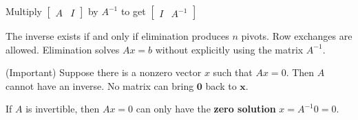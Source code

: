 \begin{center}
    Multiply $ \left[\begin{matrix}
                A & I
            \end{matrix}\right]$ by $ A^{-1}$ to get $ \left[\begin{matrix}
                I & A^{-1}
            \end{matrix}\right]$
\end{center}

\begin{remark}
    The inverse exists if and only if elimination produces $n$ pivots. Row exchanges are allowed. Elimination solves $Ax = b$ without explicitly using the matrix $A^{-1}$.
\end{remark}

\begin{remark}
    (Important) Suppose there is a nonzero vector $ x $ such that $ A x=0 . $ Then $ A $ cannot have an inverse. No matrix can bring $ \mathbf{0} $ back to $ \boldsymbol{x} $.

If $ A $ is invertible, then $ A x=0 $ can only have the \textbf{zero solution} $ x=A^{-1} 0=0 $.
\end{remark}


